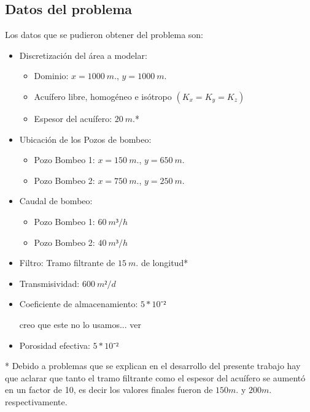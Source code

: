 \documentclass[10pt,a4paper,final]{article}
\begin{document}
\subsection{Datos del problema}
Los datos que se pudieron obtener del problema son:
\begin{itemize}
	\item Discretización del área a modelar:	
	\begin{itemize}
		\item Dominio: $x=1000 ~m.$, $y=1000 ~m.$
		\item Acuífero libre, homogéneo e isótropo $(K_x = K_y = K_z)$
		\item Espesor del acuífero: $20 ~m.$*
	\end{itemize}
	\item Ubicación de los Pozos de bombeo:
	\begin{itemize}
		\item Pozo Bombeo 1: $x=150~m.$, $y=650 ~m.$
		\item Pozo Bombeo 2: $x=750~m.$, $y=250 ~m.$
	\end{itemize}
	\item Caudal de bombeo:
	\begin{itemize}
		\item Pozo Bombeo 1: $60~m³/h$
		\item Pozo Bombeo 2: $40~m³/h$
	\end{itemize}
	\item Filtro: Tramo filtrante de $15~m.$ de longitud*
	\item Transmisividad: $600~m²/d$
	\item Coeficiente de almacenamiento: $5*10⁻²$ \begin{LARGE}
	creo que este no lo usamos... ver
	\end{LARGE}
	\item Porosidad efectiva: $5*10⁻²$
\end{itemize}
* Debido a problemas que se explican en el desarrollo del presente trabajo hay que aclarar que tanto el tramo filtrante como el espesor del acuífero se aumentó en un factor de 10, es decir los valores finales fueron de $150 m.$ y $200 m.$ respectivamente.
%
\end{document}
